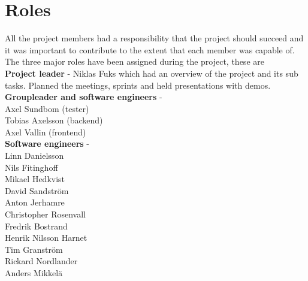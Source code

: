 \section{Roles} 
All the project members had a responsibility that the project should succeed and it was important to contribute to the extent that each member was capable of.\\
The three major roles have been assigned during the project, these are \\
\textbf{Project leader} - Niklas Fuks which had an overview of the project and its sub tasks. Planned the meetings, sprints and held presentations with demos. \\
\textbf{Groupleader and software engineers} -\\
Axel Sundbom (tester)\\
Tobias Axelsson (backend) \\
Axel Vallin (frontend) \\
\textbf{Software engineers} -\\
Linn Danielsson\\
Nils Fitinghoff\\
Mikael Hedkvist\\
David Sandström\\
Anton Jerhamre\\
Christopher Rosenvall\\
Fredrik Bostrand\\
Henrik Nilsson Harnet\\
Tim Granström\\
Rickard Nordlander\\
Anders Mikkelä\\
